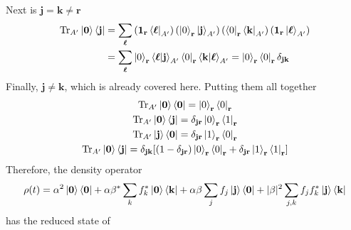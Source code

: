 \documentclass[../../../main.tex]{subfiles}
\begin{document}
Next is $\mathbf{j } =\mathbf{k } \neq \mathbf{r}$
\begin{align*}
  \mathrm{Tr} _{A'} \ket{\mathbf{0}}\bra{\mathbf{j}}
   & =  \sum_{\boldsymbol{\ell}} \left( \mathbf{1 }_\mathbf{r} \bra{\boldsymbol{\ell}}_{A'} \right)\left(\ket{0}_\mathbf{r} \ket{\mathbf{j}}_{A'} \right) \left( \bra{{0}}_\mathbf{r}  \bra{\mathbf{k}}_{A'}\right)  \left( \mathbf{1 }_\mathbf{r} \ket{\boldsymbol{\ell}}_{A'} \right) \\
   & = \sum_{\boldsymbol{\ell}}  \ket{0}_\mathbf{r} \braket{\boldsymbol{\ell  }  |\mathbf{j} }_{A'} \bra{0}_\mathbf{r} \braket{\mathbf{k } | \boldsymbol{\ell }}_{A'}
  = \ket{0}_\mathbf{r} \bra{0}_\mathbf{r} \delta_{\mathbf{jk}}
\end{align*}
Finally, $\mathbf{j } \neq \mathbf{k } $, which is already covered here.
Putting them all together
\begin{gather*}
  \mathrm{Tr} _{A'} \ket{\mathbf{0}}\bra{\mathbf{0}}  = \ket{0}_\mathbf{r } \bra{0}_\mathbf{r} \\
  \mathrm{Tr} _{A'} \ket{\mathbf{0}}\bra{\mathbf{j}}  = \delta_{\mathbf{jr}} \ket{0}_\mathbf{r } \bra{1}_\mathbf{r} \\
  \mathrm{Tr} _{A'} \ket{\mathbf{j}}\bra{\mathbf{0}} = \delta_{\mathbf{jr}} \ket{1}_\mathbf{r } \bra{0}_\mathbf{r} \\
  \mathrm{Tr} _{A'} \ket{\mathbf{0}}\bra{\mathbf{j}} =\delta_{\mathbf{jk}} [(1-\delta_{\mathbf{jr}}) \ket{0}_\mathbf{r}\bra{0}_\mathbf{r}+\delta_{\mathbf{jr}} \ket{1}_\mathbf{r} \bra{1}_\mathbf{r}]
\end{gather*}
Therefore, the density operator
\begin{equation*}
  \rho(t) = \alpha^2   \ket{\mathbf{0}}\bra{\mathbf{0}} + \alpha \beta^* \sum_k f_k^*  \ket{\mathbf{0}}\bra{\mathbf{k}} + \alpha \beta \sum_j f_j \ket{\mathbf{j}}\bra{\mathbf{0}} + |\beta|^2 \sum_{j,k} f_j f_k^* \ket{\mathbf{j}}\bra{\mathbf{k}}
\end{equation*}
has the reduced state of
\end{document}
